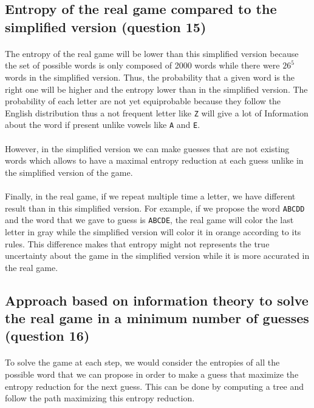 \documentclass[a4paper, 11pt, oneside]{article}
\begin{document}
\subsection{Entropy of the real game compared to the simplified version (question 15)}

\paragraph{}The entropy of the real game will be lower than this simplified version because the set of possible words is only composed of 2000 words while there were $26^5$ words in the simplified version. Thus, the probability that a given word is the right one will be higher and the entropy lower than in the simplified version. 
The probability of each letter are not yet equiprobable because they follow the English distribution thus a not frequent letter like \texttt{Z} will give a lot of Information about the word if present unlike vowels like \texttt{A} and \texttt{E}.

\paragraph{}However, in the simplified version we can make guesses that are not existing words which allows to have a maximal entropy reduction at each guess unlike in the simplified version of the game.

\paragraph{}Finally, in the real game, if we repeat multiple time a letter, we have different result than in this simplified version. For example, if we propose the word \texttt{ABCDD} and the word that we gave to guess is \texttt{ABCDE}, the real game will color the last letter in gray while the simplified version will color it in orange according to its rules. This difference makes that entropy might not represents the true uncertainty about the game in the simplified version while it is more accurated in the real game.

\subsection{Approach based on information theory to solve the real game in a minimum number of guesses (question 16)}

\paragraph{}To solve the game at each step, we would consider the entropies of all the possible word that we can propose in order to make a guess that maximize the entropy reduction for the next guess. This can be done by computing a tree and follow the path maximizing this entropy reduction.

\end{document}
